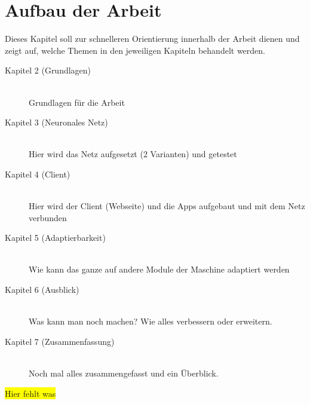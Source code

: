 \newpage

\section{Aufbau der Arbeit}
\label{sec:aufbauDerArbeit}
Dieses Kapitel soll zur schnelleren Orientierung innerhalb der Arbeit dienen und zeigt auf, welche Themen in den
jeweiligen Kapiteln behandelt werden.

\begin{description}

    \item[Kapitel 2 (Grundlagen)]\hfill \\
    Grundlagen für die Arbeit

    \item[Kapitel 3 (Neuronales Netz)]\hfill \\
    Hier wird das Netz aufgesetzt (2 Varianten) und getestet

    \item[Kapitel 4 (Client)]\hfill \\
    Hier wird der Client (Webseite) und die Apps aufgebaut und mit dem Netz verbunden

    \item[Kapitel 5 (Adaptierbarkeit)]\hfill \\
    Wie kann das ganze auf andere Module der Maschine adaptiert werden

    \item[Kapitel 6 (Ausblick)]\hfill \\
    Was kann man noch machen? Wie alles verbessern oder erweitern.

    \item[Kapitel 7 (Zusammenfassung)]\hfill \\
    Noch mal alles zusammengefasst und ein Überblick.

\end{description}

\colorbox{yellow}{Hier fehlt was}